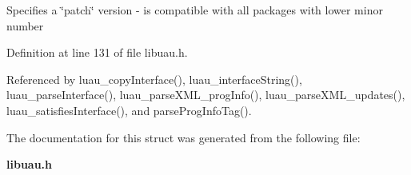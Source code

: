 Specifies a \char`\"{}patch\char`\"{} version - is compatible with all packages with lower minor number 

Definition at line 131 of file libuau.h.

Referenced by luau\_\-copy\-Interface(), luau\_\-interface\-String(), luau\_\-parse\-Interface(), luau\_\-parse\-XML\_\-prog\-Info(), luau\_\-parse\-XML\_\-updates(), luau\_\-satisfies\-Interface(), and parse\-Prog\-Info\-Tag().

The documentation for this struct was generated from the following file:\begin{CompactItemize}
\item 
{\bf libuau.h}\end{CompactItemize}
